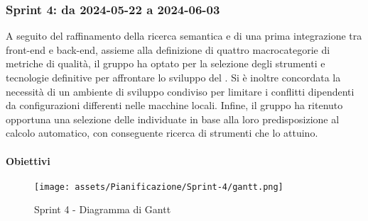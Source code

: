 \subsubsection{Sprint 4: da 2024-05-22 a 2024-06-03}
\par A seguito del raffinamento della ricerca semantica e di una prima integrazione tra
front-end e back-end, assieme alla definizione di quattro macrocategorie di metriche
di qualità, il gruppo ha optato per la selezione degli strumenti e tecnologie definitive per affrontare lo sviluppo del .
Si è inoltre concordata la necessità di un ambiente di sviluppo condiviso per limitare i conflitti dipendenti da configurazioni differenti nelle macchine locali. Infine, il gruppo ha ritenuto opportuna una selezione delle  individuate in base alla loro predisposizione al calcolo automatico, con conseguente ricerca di strumenti che lo attuino.

\paragraph{Obiettivi}

\begin{figure}[H]
  \centering
  \texttt{[image: assets/Pianificazione/Sprint-4/gantt.png]}
  \caption{Sprint 4 - Diagramma di Gantt}\label{fig:sprint-4-gantt}
\end{figure}